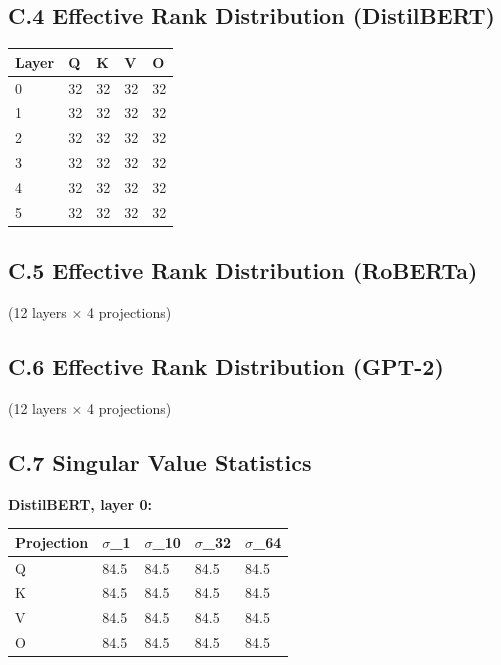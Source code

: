 \subsection{C.4 Effective Rank Distribution (DistilBERT)}

\begin{table}[H]
\centering
\small
\begin{tabular}{lllll}
\toprule
\textbf{Layer} & \textbf{Q} & \textbf{K} & \textbf{V} & \textbf{O} \\
\midrule
0 & 32 & 32 & 32 & 32 \\
1 & 32 & 32 & 32 & 32 \\
2 & 32 & 32 & 32 & 32 \\
3 & 32 & 32 & 32 & 32 \\
4 & 32 & 32 & 32 & 32 \\
5 & 32 & 32 & 32 & 32 \\
\bottomrule
\end{tabular}
\end{table}

\subsection{C.5 Effective Rank Distribution (RoBERTa)}

(12 layers $\times$ 4 projections)

\subsection{C.6 Effective Rank Distribution (GPT-2)}

(12 layers $\times$ 4 projections)

\subsection{C.7 Singular Value Statistics}

\textbf{DistilBERT, layer 0:}

\begin{table}[H]
\centering
\small
\begin{tabular}{lllll}
\toprule
\textbf{Projection} & \textbf{$\sigma$\_1} & \textbf{$\sigma$\_10} & \textbf{$\sigma$\_32} & \textbf{$\sigma$\_64} \\
\midrule
Q & 84.5 & 84.5 & 84.5 & 84.5 \\
K & 84.5 & 84.5 & 84.5 & 84.5 \\
V & 84.5 & 84.5 & 84.5 & 84.5 \\
O & 84.5 & 84.5 & 84.5 & 84.5 \\
\bottomrule
\end{tabular}
\end{table}

